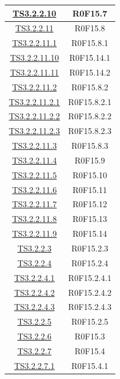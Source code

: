 \documentclass[../PianoDiQualifica.tex]{subfiles}
\begin{document}
\begin{longtable}{|c|c|}
		\hline
		\hyperlink{TS3.2.2.10}{TS3.2.2.10} & R0F15.7   \\
		\hline
		\hyperlink{TS3.2.2.11}{TS3.2.2.11} & R0F15.8   \\
		\hline
		\hyperlink{TS3.2.2.11.1}{TS3.2.2.11.1} & R0F15.8.1   \\
		\hline
		\hyperlink{TS3.2.2.11.10}{TS3.2.2.11.10} & R0F15.14.1   \\
		\hline
		\hyperlink{TS3.2.2.11.11}{TS3.2.2.11.11} & R0F15.14.2   \\
		\hline
		\hyperlink{TS3.2.2.11.2}{TS3.2.2.11.2} & R0F15.8.2   \\
		\hline
		\hyperlink{TS3.2.2.11.2.1}{TS3.2.2.11.2.1} & R0F15.8.2.1   \\
		\hline
		\hyperlink{TS3.2.2.11.2.2}{TS3.2.2.11.2.2} & R0F15.8.2.2   \\
		\hline
		\hyperlink{TS3.2.2.11.2.3}{TS3.2.2.11.2.3} & R0F15.8.2.3   \\
		\hline
		\hyperlink{TS3.2.2.11.3}{TS3.2.2.11.3} & R0F15.8.3   \\
		\hline
		\hyperlink{TS3.2.2.11.4}{TS3.2.2.11.4} & R0F15.9   \\
		\hline
		\hyperlink{TS3.2.2.11.5}{TS3.2.2.11.5} & R0F15.10   \\
		\hline
		\hyperlink{TS3.2.2.11.6}{TS3.2.2.11.6} & R0F15.11   \\
		\hline
		\hyperlink{TS3.2.2.11.7}{TS3.2.2.11.7} & R0F15.12   \\
		\hline
		\hyperlink{TS3.2.2.11.8}{TS3.2.2.11.8} & R0F15.13   \\
		\hline
		\hyperlink{TS3.2.2.11.9}{TS3.2.2.11.9} & R0F15.14   \\
		\hline
		\hyperlink{TS3.2.2.3}{TS3.2.2.3} & R0F15.2.3   \\
		\hline
		\hyperlink{TS3.2.2.4}{TS3.2.2.4} & R0F15.2.4   \\
		\hline
		\hyperlink{TS3.2.2.4.1}{TS3.2.2.4.1} & R0F15.2.4.1   \\
		\hline
		\hyperlink{TS3.2.2.4.2}{TS3.2.2.4.2} & R0F15.2.4.2   \\
		\hline
		\hyperlink{TS3.2.2.4.3}{TS3.2.2.4.3} & R0F15.2.4.3   \\
		\hline
		\hyperlink{TS3.2.2.5}{TS3.2.2.5} & R0F15.2.5   \\
		\hline
		\hyperlink{TS3.2.2.6}{TS3.2.2.6} & R0F15.3   \\
		\hline
		\hyperlink{TS3.2.2.7}{TS3.2.2.7} & R0F15.4   \\
		\hline
		\hyperlink{TS3.2.2.7.1}{TS3.2.2.7.1} & R0F15.4.1   \\

\end{longtable}
\end{document}
